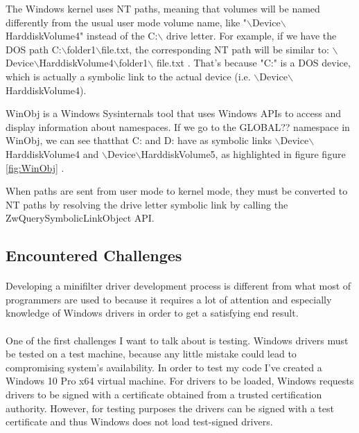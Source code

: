 		The Windows kernel uses NT paths, meaning that volumes will be named differently from the usual user mode volume name, like "$\backslash$Device$\backslash$HarddiskVolume4" instead of the C:$\backslash$ drive letter. For example, if we have the DOS path C:$\backslash$folder1$\backslash$file.txt, the corresponding NT path will be similar to: $\backslash$Device$\backslash$HarddiskVolume4$\backslash$folder1$\backslash$ file.txt  \cite{MSDNNamespaces}. That's because "C:" is a DOS device, which is actually a symbolic link to the actual device (i.e. $\backslash$Device$\backslash$HarddiskVolume4).
		
		WinObj is a Windows Sysinternals tool that uses Windows APIs to access and display information about namespaces. If we go to the GLOBAL?? namespace in WinObj, we can see thatthat C: and D: have as symbolic links $\backslash$Device$\backslash$ HarddiskVolume4 and $\backslash$Device$\backslash$HarddiskVolume5, as highlighted in figure figure \ref{fig:WinObj} .
		
		When paths are sent from user mode to kernel mode, they must be converted to NT paths by resolving the drive letter symbolic link by calling the ZwQuerySymbolicLinkObject API.
		
		\subsection{Encountered Challenges}
		\paragraph{}
		Developing a minifilter driver development process is different from what most of programmers are used to because it requires a lot of attention and especially knowledge of Windows drivers in order to get a satisfying end result.
		
		\paragraph{}
		One of the first challenges I want to talk about is testing. Windows drivers must be tested on a test machine, because any little mistake could lead to compromising system's availability. In order to test my code I've created a Windows 10 Pro x64 virtual machine. For drivers to be loaded, Windows requests drivers to be signed with a certificate obtained from a trusted certification authority. However, for testing purposes the drivers can be signed with a test certificate and thus Windows does not load test-signed drivers. 
		
